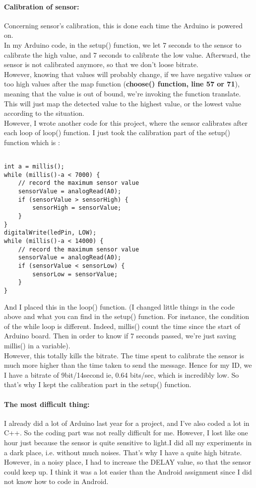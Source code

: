 \documentclass[12pt]{article}
\begin{document}
\paragraph{Calibration of sensor:} Concerning sensor's calibration, this is done each time the Arduino is powered on. \\
In my Arduino code, in the setup() function, we let 7 seconds to the sensor to calibrate the high value, and 7 seconds to calibrate the low value. Afterward, the sensor is not calibrated anymore, so that we don't loose bitrate.\\
However, knowing that values will probably change, if we have negative values or too high values after the map function (\textbf{choose() function, line 57 or 71}), meaning that the value is out of bound, we're invoking the function translate. This will just map the detected value to the highest value, or the lowest value according to the situation.\\
However, I wrote another code for this project, where the sensor calibrates after each loop of loop() function. I just took the calibration part of the setup() function which is : 
\begin{lstlisting}

int a = millis();
while (millis()-a < 7000) {
	// record the maximum sensor value
	sensorValue = analogRead(A0);
	if (sensorValue > sensorHigh) {
		sensorHigh = sensorValue;
	}
}
digitalWrite(ledPin, LOW);
while (millis()-a < 14000) {
	// record the maximum sensor value
	sensorValue = analogRead(A0);
	if (sensorValue < sensorLow) {
		sensorLow = sensorValue;
	}
}
\end{lstlisting}
And I placed this in the loop() function. (I changed little things in the code above and what you can find in the setup() function. For instance, the condition of the while loop is different. Indeed, millis() count the time since the start of Arduino board. Then in order to know if 7 seconds passed, we're just saving millis() in a variable).\\
However, this totally kills the bitrate. The time spent to calibrate the sensor is much more higher than the time taken to send the message. Hence for my ID, we I have a bitrate of 9bit/14second ie, 0.64 bits/sec, which is incredibly low. So that's why I kept the calibration part in the setup() function.

\paragraph{The most difficult thing:}  I already did a lot of Arduino last year for a project, and I've also coded a lot in C++. So the coding part was not really difficult for me. However, I lost like one hour just because the sensor is quite sensitive to light.I did all my experiments in a dark place, i.e. without much noises. That's why I have a quite high bitrate. However, in a noisy place, I had to increase the DELAY value, so that the sensor could keep up. I think it was a lot easier than the Android assignment since I did not know how to code in Android.
\end{document}
